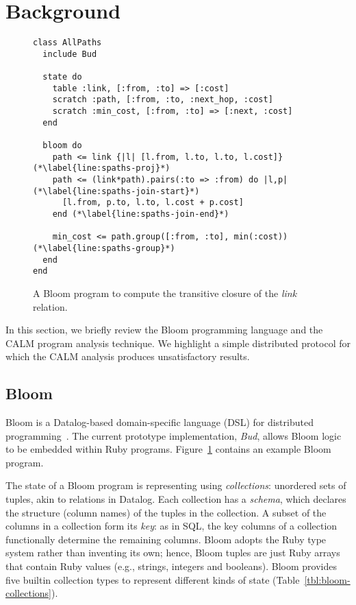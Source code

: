 \section{Background}
\label{sec:background}

\begin{figure}[t]
\begin{scriptsize}
\begin{lstlisting}
class AllPaths
  include Bud

  state do
    table :link, [:from, :to] => [:cost]
    scratch :path, [:from, :to, :next_hop, :cost]
    scratch :min_cost, [:from, :to] => [:next, :cost]
  end

  bloom do
    path <= link {|l| [l.from, l.to, l.to, l.cost]} (*\label{line:spaths-proj}*)
    path <= (link*path).pairs(:to => :from) do |l,p| (*\label{line:spaths-join-start}*)
      [l.from, p.to, l.to, l.cost + p.cost]
    end (*\label{line:spaths-join-end}*)

    min_cost <= path.group([:from, :to], min(:cost)) (*\label{line:spaths-group}*)
  end
end
\end{lstlisting}
\end{scriptsize}
\caption{A Bloom program to compute the transitive closure of the
  \emph{link} relation.}
\label{fig:bloom-spaths}
\end{figure}

In this section, we briefly review the Bloom programming language and the CALM
program analysis technique.  We highlight a simple distributed protocol for
which the CALM analysis produces unsatisfactory results.

\subsection{Bloom}
\label{sec:bg-bloom}

Bloom is a Datalog-based domain-specific language (DSL) for distributed
programming~\cite{Alvaro2011,bloom}. The current prototype implementation,
\emph{Bud}, allows Bloom logic to be embedded within Ruby
programs. Figure~\ref{fig:bloom-spaths} contains an example Bloom program.

The state of a Bloom program is representing using \emph{collections}: unordered
sets of tuples, akin to relations in Datalog. Each collection has a
\emph{schema}, which declares the structure (column names) of the tuples in the
collection. A subset of the columns in a collection form its \emph{key}: as in
SQL, the key columns of a collection functionally determine the remaining
columns. Bloom adopts the Ruby type system rather than inventing its own; hence,
Bloom tuples are just Ruby arrays that contain Ruby values (e.g., strings,
integers and booleans). Bloom provides five builtin collection types to
represent different kinds of state (Table~\ref{tbl:bloom-collections}).

